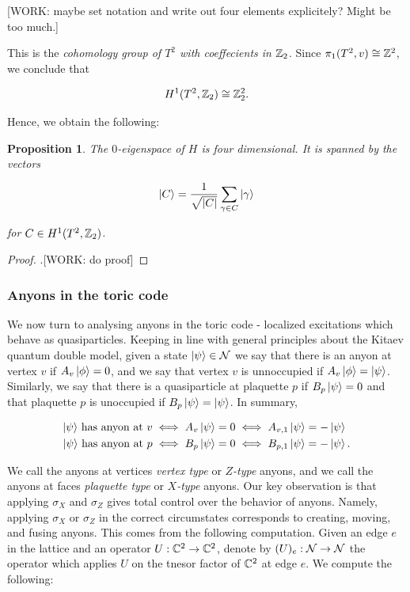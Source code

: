 \documentclass{article}
\newtheorem{proposition}{Proposition}[section]
\theoremstyle{definition}
\numberwithin{figure}{section}
\begin{document}
[WORK: maybe set notation and write out four elements explicitely? Might be too much.]

This is the \textit{cohomology group of $T^2$ with coeffecients in $\mathbb{Z}_2$}. Since $\pi_1(T^2,v)\cong \mathbb{Z}^2$, we conclude that

$$H^1(T^2,\mathbb{Z}_2)\cong \mathbb{Z}_2^2.$$

Hence, we obtain the following:

\begin{proposition} The $0$-eigenspace of $H$ is four dimensional. It is spanned by the vectors

$$\ket{C}=\frac{1}{\sqrt{|C|}}\sum_{\gamma\in C}\ket{\gamma}$$

for $C\in H^1(T^2,\mathbb{Z}_2)$.
\end{proposition}
\begin{proof}.[WORK: do proof]
\end{proof}

\subsubsection{Anyons in the toric code}

We now turn to analysing anyons in the toric code - localized excitations which behave as quasiparticles. Keeping in line with general principles about the Kitaev quantum double model, given a state $\ket{\psi}\in \mathcal{N}$ we say that there is an anyon at vertex $v$ if $A_v\ket{\phi}=0$, and we say that vertex $v$ is unnoccupied if $A_v\ket{\phi}=\ket{\psi}$. Similarly, we say that there is a quasiparticle at plaquette $p$ if $B_p\ket{\psi}=0$ and that plaquette $p$ is unoccupied if $B_p\ket{\psi}=\ket{\psi}$. In summary,

\begin{align*}
\text{$\ket{\psi}$ has anyon at $v$}\iff A_v\ket{\psi}&=0 \iff A_{v,1}\ket{\psi}=-\ket{\psi}\\
\text{$\ket{\psi}$ has anyon at $p$}\iff B_p\ket{\psi}&=0 \iff B_{p,1}\ket{\psi}=-\ket{\psi}.
\end{align*}

We call the anyons at vertices \textit{vertex type} or \textit{$Z$-type} anyons, and we call the anyons at faces \textit{plaquette type} or \textit{$X$-type} anyons. Our key observation is that applying $\sigma_X$ and $\sigma_Z$ gives total control over the behavior of anyons. Namely, applying $\sigma_X$ or $\sigma_Z$ in the correct circumstates corresponds to creating, moving, and fusing anyons. This comes from the following computation. Given an edge $e$ in the lattice and an operator $U:\mathbb{C}^2\to \mathbb{C}^2$, denote by $(U)_e:\mathcal{N}\to\mathcal{N}$ the operator which applies $U$ on the tnesor factor of $\mathbb{C}^2$ at edge $e$. We compute the following:
\end{document}
